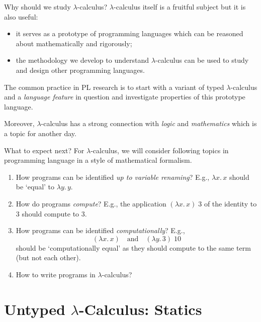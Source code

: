 \begin{frame}{Why should we study $\lambda$-calculus?}
  $\lambda$-calculus itself is a fruitful subject but it is also useful: 
  \begin{itemize}
    \item it serves as a prototype of programming languages which can be reasoned about \alert{mathematically} and \alert{rigorously};
    \item the methodology we develop to understand $\lambda$-calculus can be used to study and design other programming languages.
  \end{itemize}
  \vfill
  The common practice in PL research is to start with a variant of typed $\lambda$-calculus and a \emph{language feature} in question and investigate properties of this prototype language.

  \vfill 
  Moreover, $\lambda$-calculus has a strong connection with \emph{logic} and \emph{mathematics} which is a topic for another day.
\end{frame}

\begin{frame}{What to expect next?}
  For $\lambda$-calculus, we will consider following topics in programming language in a style of mathematical formalism.
  \begin{enumerate}
    \item How programs can be identified \emph{up to variable renaming}?
      E.g., $\lambda x.\, x$ should be `equal' to $\lambda y.\, y$.
    \item How do programs \emph{compute}?
      E.g., the application $(\lambda x.\, x)\;3$ of the identity to $3$ should compute to $3$.
    \item How programs can be identified \emph{computationally}?
      E.g.,
      \[
        (\lambda x.\, x) \quad\text{and}\quad (\lambda y.\, 3)\;10
      \]
      should be `computationally equal' as they should compute to the same term (but not each other).
    \item How to write programs in $\lambda$-calculus?
  \end{enumerate}
\end{frame}

\section{Untyped \texorpdfstring{$\lambda$}{λ}-Calculus: Statics}

